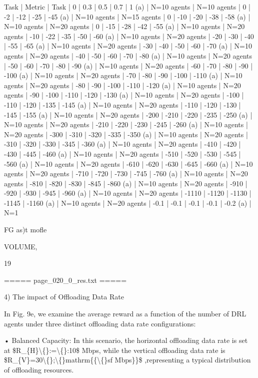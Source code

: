 \documentclass{article}
\begin{document}
Task | Metric | Task | 0 | 0.3 | 0.5 | 0.7 | 1
(a) | N=10 agents | N=10 agents | 0 | -2 | -12 | -25 | -45
(a) | N=10 agents | N=15 agents | 0 | -10 | -20 | -38 | -58
(a) | N=10 agents | N=20 agents | 0 | -15 | -28 | -42 | -55
(a) | N=10 agents | N=20 agents | -10 | -22 | -35 | -50 | -60
(a) | N=10 agents | N=20 agents | -20 | -30 | -40 | -55 | -65
(a) | N=10 agents | N=20 agents | -30 | -40 | -50 | -60 | -70
(a) | N=10 agents | N=20 agents | -40 | -50 | -60 | -70 | -80
(a) | N=10 agents | N=20 agents | -50 | -60 | -70 | -80 | -90
(a) | N=10 agents | N=20 agents | -60 | -70 | -80 | -90 | -100
(a) | N=10 agents | N=20 agents | -70 | -80 | -90 | -100 | -110
(a) | N=10 agents | N=20 agents | -80 | -90 | -100 | -110 | -120
(a) | N=10 agents | N=20 agents | -90 | -100 | -110 | -120 | -130
(a) | N=10 agents | N=20 agents | -100 | -110 | -120 | -135 | -145
(a) | N=10 agents | N=20 agents | -110 | -120 | -130 | -145 | -155
(a) | N=10 agents | N=20 agents | -200 | -210 | -220 | -235 | -250
(a) | N=10 agents | N=20 agents | -210 | -220 | -230 | -245 | -260
(a) | N=10 agents | N=20 agents | -300 | -310 | -320 | -335 | -350
(a) | N=10 agents | N=20 agents | -310 | -320 | -330 | -345 | -360
(a) | N=10 agents | N=20 agents | -410 | -420 | -430 | -445 | -460
(a) | N=10 agents | N=20 agents | -510 | -520 | -530 | -545 | -560
(a) | N=10 agents | N=20 agents | -610 | -620 | -630 | -645 | -660
(a) | N=10 agents | N=20 agents | -710 | -720 | -730 | -745 | -760
(a) | N=10 agents | N=20 agents | -810 | -820 | -830 | -845 | -860
(a) | N=10 agents | N=20 agents | -910 | -920 | -930 | -945 | -960
(a) | N=10 agents | N=20 agents | -1110 | -1120 | -1130 | -1145 | -1160
(a) | N=10 agents | N=20 agents | -0.1 | -0.1 | -0.1 | -0.1 | -0.2
(a) | N=1

FG as)t mofle

VOLUME,

19

===== page\_020\_0\_res.txt =====


4) The impact of Offloading Data Rate

In Fig. 9e, we examine the average reward as a function of the number of DRL agents under three distinct offloading data rate configurations:

• Balanced Capacity: In this scenario, the horizontal offloading data rate is set at \$R\_\{H\}\textbackslash\{\}:=\textbackslash\{\}:10\$ Mbps, while the vertical offloading data rate is \$R\_\{V\}=30\textbackslash\{\};\textbackslash\{\}mathrm\{\{\textbackslash\{\}sf Mbps\}\}\$ ,representing a typical distribution of offloading resources.
\end{document}
